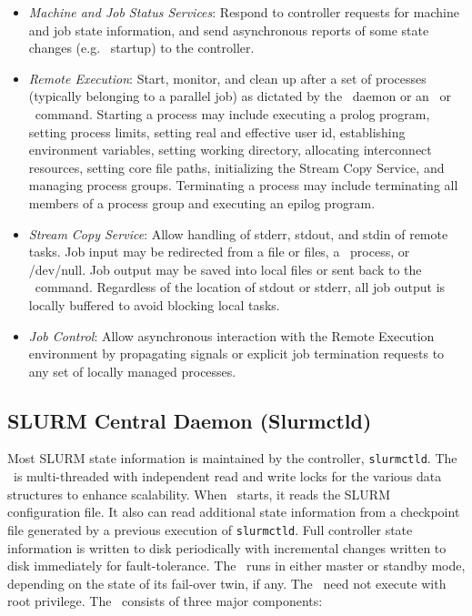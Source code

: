 \begin{itemize}
\item {\em Machine and Job Status Services}:  Respond to controller 
requests for machine and job state information, and send asynchronous 
reports of some state changes (e.g. \slurmd\ startup) to the controller.

\item {\em Remote Execution}: Start, monitor, and clean up after a set
of processes (typically belonging to a parallel job) as dictated by the
\slurmctld\ daemon or an \srun\ or \scancel\ command. Starting a process may
include executing a prolog program, setting process limits, setting real
and effective user id, establishing environment variables, setting working
directory, allocating interconnect resources, setting core file paths,
initializing the Stream Copy Service, and managing
process groups. Terminating a process may include terminating all members
of a process group and executing an epilog program.

\item {\em Stream Copy Service}: Allow handling of stderr, stdout, and
stdin of remote tasks. Job input may be redirected from a file or files, a
\srun\ process, or /dev/null.  Job output may be saved into local files or
sent back to the \srun\ command. Regardless of the location of stdout or stderr,
all job output is locally buffered to avoid blocking local tasks.

\item {\em Job Control}: Allow asynchronous interaction with the
Remote Execution environment by propagating signals or explicit job
termination requests to any set of locally managed processes.

\end{itemize}

\subsection{SLURM Central Daemon (Slurmctld)}

Most SLURM state information is maintained by the controller, {\tt slurmctld}.
The \slurmctld\ is multi-threaded with independent read and write locks 
for the various data structures to enhance scalability. 
When \slurmctld\ starts, it reads the SLURM configuration file.  
It also can read additional state information
from a checkpoint file generated by a previous execution of {\tt slurmctld}.
Full controller state information is written to 
disk periodically with incremental changes written to disk immediately
for fault-tolerance.  
The \slurmctld\ runs in either master or standby mode, depending on the
state of its fail-over twin, if any.
The \slurmctld\ need not execute with root privilege.
The \slurmctld\ consists of three major components:

